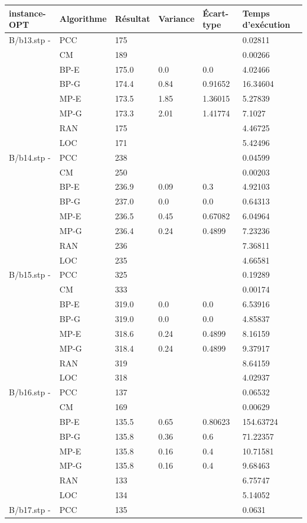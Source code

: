 \documentclass[12pt,a4paper]{article}
\begin{document}
\begin{center}
	\begin{tabular}{l|l|l|l|l|l}
		instance-OPT & Algorithme & Résultat & Variance & Écart-type & Temps d'exécution\\ \hline \hline
		B/b13.stp - &PCC&175&&&0.02811\\
		&CM&189&&&0.00266\\
		&BP-E&175.0&0.0&0.0&4.02466\\
		&BP-G&174.4&0.84&0.91652&16.34604\\
		&MP-E&173.5&1.85&1.36015&5.27839\\
		&MP-G&173.3&2.01&1.41774&7.1027\\
		&RAN&175&&&4.46725\\
		&LOC&171&&&5.42496\\\hline
		B/b14.stp - &PCC&238&&&0.04599\\
		&CM&250&&&0.00203\\
		&BP-E&236.9&0.09&0.3&4.92103\\
		&BP-G&237.0&0.0&0.0&0.64313\\
		&MP-E&236.5&0.45&0.67082&6.04964\\
		&MP-G&236.4&0.24&0.4899&7.23236\\
		&RAN&236&&&7.36811\\
		&LOC&235&&&4.66581\\\hline
		B/b15.stp - &PCC&325&&&0.19289\\
		&CM&333&&&0.00174\\
		&BP-E&319.0&0.0&0.0&6.53916\\
		&BP-G&319.0&0.0&0.0&4.85837\\
		&MP-E&318.6&0.24&0.4899&8.16159\\
		&MP-G&318.4&0.24&0.4899&9.37917\\
		&RAN&319&&&8.64159\\
		&LOC&318&&&4.02937\\\hline
		B/b16.stp - &PCC&137&&&0.06532\\
		&CM&169&&&0.00629\\
		&BP-E&135.5&0.65&0.80623&154.63724\\
		&BP-G&135.8&0.36&0.6&71.22357\\
		&MP-E&135.8&0.16&0.4&10.71581\\
		&MP-G&135.8&0.16&0.4&9.68463\\
		&RAN&133&&&6.75747\\
		&LOC&134&&&5.14052\\\hline
		B/b17.stp - &PCC&135&&&0.0631\\

\end{tabular}
\end{center}
\end{document}
